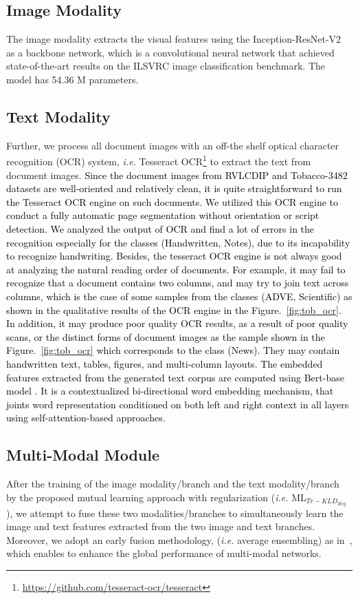 \documentclass[twocolumn]{svjour3}
\newcommand{\ie}{\textit{i.e. }}
\begin{document}
\subsection{Image Modality}
The image modality extracts the visual features using the Inception-ResNet-V2 \cite{Szegedy2017Inceptionv4IA} as a backbone network, which is a convolutional neural network that achieved state-of-the-art results on the ILSVRC image classification benchmark. The model has 54.36 M parameters. 

\subsection{Text Modality}
Further, we process all document images with an off-the shelf optical character recognition (OCR) system, \ie Tesseract OCR\footnote{\url{https://github.com/tesseract-ocr/tesseract}} to extract the text from document images. \textcolor{black}{Since the document images from RVLCDIP and Tobacco-3482 datasets are well-oriented and relatively clean, it is quite straightforward to run the Tesseract OCR engine on such documents. We utilized this OCR engine to conduct a fully automatic page segmentation without orientation or script detection. We analyzed the output of OCR and find a lot of errors in the recognition especially for the classes (Handwritten, Notes), due to its incapability to recognize handwriting. Besides, the tesseract OCR engine is not always good at analyzing the natural reading order of documents. \textcolor{black}{For example, it may fail to recognize that a document contains two columns, and may try to join text across columns, which is the case of some samples from the classes (ADVE, Scientific) as shown in the qualitative results of the OCR engine in the Figure.~\ref{fig:tob_ocr}. In addition, it may produce poor quality OCR results, as a result of poor quality scans, or the distinct forms of document images as the sample shown in the Figure.~\ref{fig:tob_ocr} which corresponds to the class (News). They may contain handwritten text, tables, figures, and multi-column layouts}. The embedded features extracted from the generated text corpus are computed using Bert-base model \cite{Devlin2019BERTPO}. It is a contextualized bi-directional word embedding mechanism, that joints word representation conditioned on both left and right context in all layers using self-attention-based approaches.}

\subsection{Multi-Modal Module}
After the training of the image modality/branch and the text modality/branch by the proposed mutual learning approach with regularization (\textit{i.e.} ML$_{{Tr-KLD}_{Reg}}$), we attempt to fuse these two modalities/branches to simultaneously learn the image and text features extracted from the two image and text branches. Moreover, we adopt an early fusion methodology, (\textit{i.e.} average ensembling) as in~\cite{souhailbakkali}, which enables to enhance the global performance of multi-modal networks.
\end{document}
